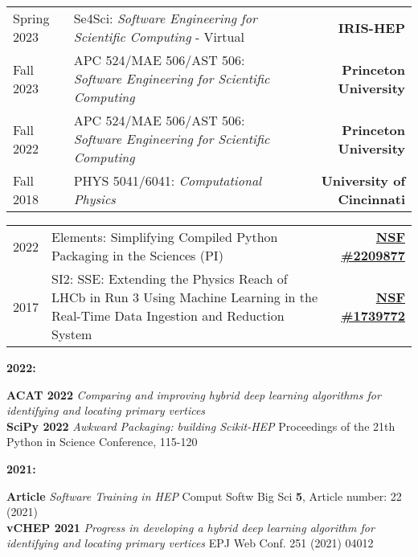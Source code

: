 \documentclass[10pt,letterpaper]{moderncv}
\begin{document}
\begin{tabularx}{\textwidth}{p{.8in}X>{\bfseries}r}
    Spring 2023 & Se4Sci: \textit{Software Engineering for Scientific Computing} - Virtual & IRIS-HEP \\
    Fall 2023 & APC 524/MAE 506/AST 506: \textit{Software Engineering for Scientific Computing} & Princeton University \\
    Fall 2022 & APC 524/MAE 506/AST 506: \textit{Software Engineering for Scientific Computing} & Princeton University \\
    Fall 2018 & PHYS 5041/6041: \textit{Computational Physics} & University of Cincinnati \\
\end{tabularx}

\begin{tabularx}{\textwidth}{p{.5in}X>{\bfseries}r}
    2022 & Elements: Simplifying Compiled Python Packaging in the Sciences (PI) & \href{https://nsf.gov/awardsearch/showAward?AWD_ID=NSF 2209877}{NSF \#2209877} \\
    2017 & SI2: SSE: Extending the Physics Reach of LHCb in Run 3 Using Machine Learning in the Real-Time Data Ingestion and Reduction System & \href{https://nsf.gov/awardsearch/showAward?AWD_ID=1739772}{NSF \#1739772} \\ %
\end{tabularx}


\begin{minipage}[t]{.065\textwidth}
\textbf{2022:}
\end{minipage}%
\begin{minipage}[t]{.935\textwidth}
\textbf{ACAT 2022} \emph{Comparing and improving hybrid deep learning algorithms for identifying and locating primary vertices} \\
\textbf{SciPy 2022} \emph{Awkward Packaging: building Scikit-HEP} Proceedings of the 21th Python in Science Conference, 115-120 \\
\end{minipage}

\begin{minipage}[t]{.065\textwidth}
\textbf{2021:}
\end{minipage}%
\begin{minipage}[t]{.935\textwidth}
\textbf{Article} \emph{Software Training in HEP} Comput Softw Big Sci \textbf{5}, Article number: 22 (2021) \\
\textbf{vCHEP 2021} \emph{Progress in developing a hybrid deep learning algorithm for identifying and locating primary vertices} EPJ Web Conf. 251 (2021) 04012
\end{minipage}
\end{document}
